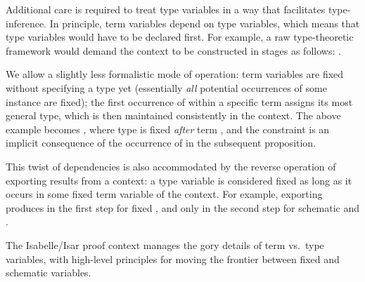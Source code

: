 \begin{isabellebody}
\begin{isamarkuptext}
  \medskip Additional care is required to treat type variables in a
  way that facilitates type-inference.  In principle, term variables
  depend on type variables, which means that type variables would have
  to be declared first.  For example, a raw type-theoretic framework
  would demand the context to be constructed in stages as follows:
  .

  We allow a slightly less formalistic mode of operation: term
  variables  are fixed without specifying a type yet
  (essentially \emph{all} potential occurrences of some instance
   are fixed); the first occurrence of 
  within a specific term assigns its most general type, which is then
  maintained consistently in the context.  The above example becomes
  , where type \isa{{\isasymalpha}} is fixed \emph{after} term , and the constraint
   is an implicit consequence of the occurrence of
   in the subsequent proposition.

  This twist of dependencies is also accommodated by the reverse
  operation of exporting results from a context: a type variable
  \isa{{\isasymalpha}} is considered fixed as long as it occurs in some fixed
  term variable of the context.  For example, exporting  produces in the first step
   for fixed \isa{{\isasymalpha}},
  and only in the second step  for schematic  and \isa{{\isacharquery}{\isasymalpha}}.

  \medskip The Isabelle/Isar proof context manages the gory details of
  term vs.\ type variables, with high-level principles for moving the
  frontier between fixed and schematic variables.


\end{isamarkuptext}
\end{isabellebody}
